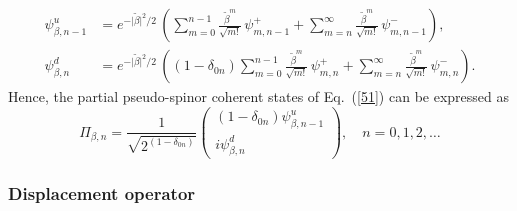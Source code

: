 \documentclass[aps,showpacs,showkeys]{revtex4}
\begin{document}
	\begin{align*}
\psi^u_{\beta,n-1}&=  e^{-\vert\tilde{\beta}\vert^2 /2}\, \left( \sum_{m=0}^{n-1}\frac{\tilde{\beta}^m}{\sqrt{m!}}\, \psi_{m,n-1}^{+}+\sum_{m=n}^{\infty}\frac{\tilde{\beta}^m}{\sqrt{m!}}\, \psi_{m,n-1}^{-}\right), %
\\
\psi^d_{\beta,n}&=e^{-\vert\tilde{\beta}\vert^2 /2}\, \left((1-\delta_{0n})\sum_{m=0}^{n-1}\frac{\tilde{\beta}^m}{\sqrt{m!}}\, \psi_{m,n}^{+}+\sum_{m=n}^{\infty}\frac{\tilde{\beta}^m}{\sqrt{m!}}\, \psi_{m,n}^{-}\right). %
\end{align*}
Hence, the partial pseudo-spinor coherent states of Eq.~(\ref{51}) can be expressed as
\begin{equation}\label{53}
\Pi_{\beta,n}=\frac{1}{\sqrt{2^{(1-\delta_{0n})}}}\left(\begin{array}{c}
(1-\delta_{0n})\psi^u_{\beta,n-1} \\ [1ex]
i\psi^d_{\beta,n}
\end{array}\right), \quad n=0,1,2,\dots
\end{equation}



\subsubsection{Displacement operator}\label{sec3.1.1}
\end{document}
